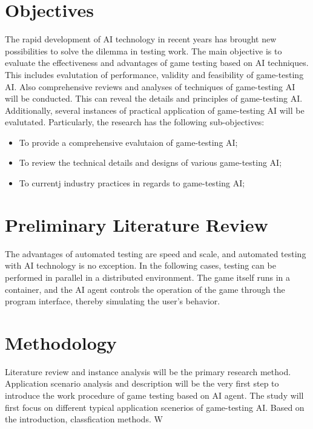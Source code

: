 \documentclass[11pt,en,authoryear]{elegantpaper}
\begin{document}
\section{Objectives}
\noindent
The rapid development of AI technology in recent years has brought new possibilities to solve the dilemma in testing work. The main objective is to evaluate the effectiveness and advantages of game testing based on AI techniques. This includes evalutation of performance, validity and feasibility of game-testing AI. Also comprehensive reviews and analyses of techniques of game-testing AI will be conducted. This can reveal the details and principles of game-testing AI. Additionally, several instances of practical application of game-testing AI will be evalutated. Particularly, the research has the following sub-objectives:
\begin{itemize}
    \item To provide a comprehensive evalutaion of game-testing AI;
    \item To review the technical details and designs of various game-testing AI;
    \item To currentj industry practices in regards to game-testing AI;
\end{itemize}

\section{Preliminary Literature Review}
The advantages of automated testing are speed and scale, and automated testing with AI technology is no exception. In the following cases, testing can be performed in parallel in a distributed environment. The game itself runs in a container, and the AI ​​agent controls the operation of the game through the program interface, thereby simulating the user's behavior.

\section{Methodology}
Literature review and instance analysis will be the primary research method. Application scenario analysis and description will be the very first step to introduce the work procedure of game testing based on AI agent. The study will first focus on different typical application scenerios of game-testing AI. Based on the introduction, classfication methods. W



\end{document}
